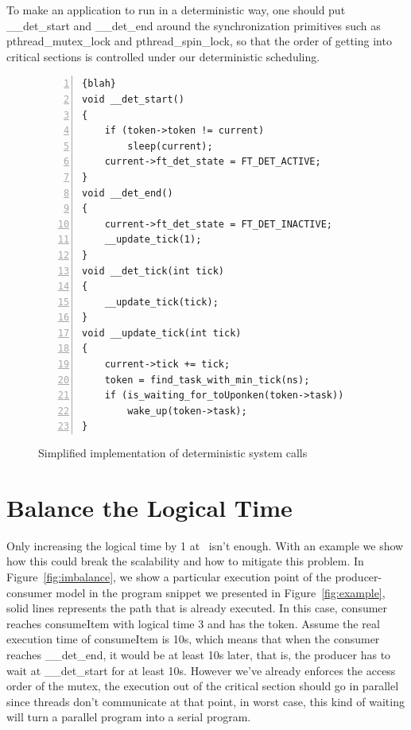 To make an application to run in a deterministic way, one should put \_\_det\_start and \_\_det\_end around the synchronization primitives such as pthread\_mutex\_lock and pthread\_spin\_lock, so that the order of getting into critical sections is controlled under our deterministic scheduling.

\begin{figure}
\begin{lstlisting}[numbers=left, frame=single, basicstyle=\small, breaklines]{blah}
void __det_start()
{
    if (token->token != current)
        sleep(current);
    current->ft_det_state = FT_DET_ACTIVE;        
}
void __det_end()
{
    current->ft_det_state = FT_DET_INACTIVE;
    __update_tick(1);
}
void __det_tick(int tick)
{
    __update_tick(tick);
}
void __update_tick(int tick)
{
    current->tick += tick;
    token = find_task_with_min_tick(ns);
    if (is_waiting_for_toUponken(token->task))
    	wake_up(token->task);
}
\end{lstlisting}
\caption{Simplified implementation of deterministic system calls}
\label{f:algorithm}
\end{figure}

\section{Balance the Logical Time} \label{sec:logimbalance}
Only increasing the logical time by 1 at \detend\ isn't enough. With an example we show how this could break the scalability and how to mitigate this problem. In Figure~\ref{fig:imbalance}, we show a particular execution point of the producer-consumer model in the program snippet we presented in Figure~\ref{fig:example}, solid lines represents the path that is already executed. In this case, consumer reaches consumeItem with logical time 3 and has the token. Assume the real execution time of consumeItem is 10s, which means that when the consumer reaches \_\_det\_end, it would be at least 10s later, that is, the producer has to wait at \_\_det\_start for at least 10s. However we've already enforces the access order of the mutex, the execution out of the critical section should go in parallel since threads don't communicate at that point, in worst case, this kind of waiting will turn a parallel program into a serial program.

